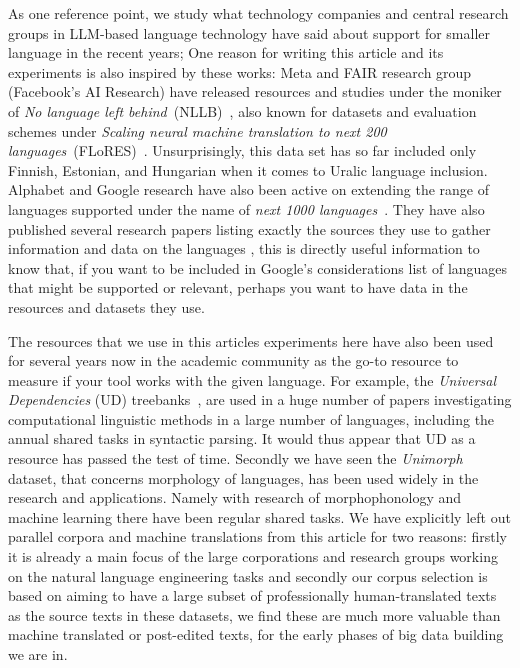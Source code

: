 \documentclass[free]{flammie}
\begin{document}
As one reference point, we study what technology companies and central research
groups in LLM-based language technology have said about support for smaller
language in the recent years; One reason for writing this article and its
experiments is also inspired by these works: Meta and FAIR research group
(Facebook's AI Research) have released resources and studies under the moniker
of \textit{No language left behind}~(NLLB)~\cite{nllb}, also known for datasets
and evaluation schemes under \textit{Scaling neural machine translation to next
200 languages}~(FLoRES)~\cite{flores}. Unsurprisingly, this data set has so far
included only Finnish, Estonian, and Hungarian when it comes to Uralic language
inclusion.  Alphabet and Google research have also been active on extending the
range of languages supported under the name of \textit{next 1000
languages}~\cite{bapna2022buildingmachinetranslationsystems}. They have also
published several research papers listing exactly the sources they use to gather
information and data on the languages \cite{ritchie-etal-2024-linguameta}, this
is directly useful information to know that, if you want to be included in
Google's considerations list of languages that might be supported or relevant,
perhaps you want to have data in the resources and datasets they use.

The resources that we use in this articles experiments here have also been used
for several years now in the academic community as the go-to resource to measure
if your tool works with the given language.  For example, the \textit{Universal
Dependencies} (UD) treebanks~\cite{ud214}, are used in a huge number of papers
investigating computational linguistic methods in a large number of languages,
including the annual shared tasks in syntactic parsing.  It would thus appear
that UD as a resource has passed the test of time.  Secondly we have seen the
\textit{Unimorph} dataset, that concerns morphology of languages, has been used
widely in the research and applications. Namely with research of morphophonology
and machine learning there have been regular shared tasks.
We have explicitly left out parallel corpora and machine translations from this
article for two reasons: firstly it is already a main focus of the large
corporations and research groups working on the natural language engineering
tasks and secondly our corpus selection is based on aiming to have a large
subset of professionally human-translated texts as the source texts in these
datasets, we find these are much more valuable than machine translated or
post-edited texts, for the early phases of big data building we are in.
\end{document}

